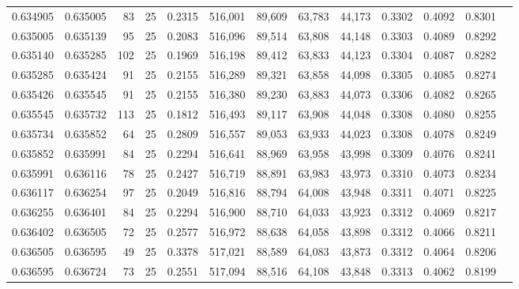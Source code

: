 \begin{tabular}{rrrrrrrrrrrrr}
0.634905 & 0.635005 &    83 &  25 &                                     0.2315 & 516,001 &  89,609 &  63,783 &  44,173 & 0.3302 & 0.4092 & 0.8301 \\
0.635005 & 0.635139 &    95 &  25 &                                     0.2083 & 516,096 &  89,514 &  63,808 &  44,148 & 0.3303 & 0.4089 & 0.8292 \\
0.635140 & 0.635285 &   102 &  25 &                                     0.1969 & 516,198 &  89,412 &  63,833 &  44,123 & 0.3304 & 0.4087 & 0.8282 \\
0.635285 & 0.635424 &    91 &  25 &                                     0.2155 & 516,289 &  89,321 &  63,858 &  44,098 & 0.3305 & 0.4085 & 0.8274 \\
0.635426 & 0.635545 &    91 &  25 &                                     0.2155 & 516,380 &  89,230 &  63,883 &  44,073 & 0.3306 & 0.4082 & 0.8265 \\
0.635545 & 0.635732 &   113 &  25 &                                     0.1812 & 516,493 &  89,117 &  63,908 &  44,048 & 0.3308 & 0.4080 & 0.8255 \\
0.635734 & 0.635852 &    64 &  25 &                                     0.2809 & 516,557 &  89,053 &  63,933 &  44,023 & 0.3308 & 0.4078 & 0.8249 \\
0.635852 & 0.635991 &    84 &  25 &                                     0.2294 & 516,641 &  88,969 &  63,958 &  43,998 & 0.3309 & 0.4076 & 0.8241 \\
0.635991 & 0.636116 &    78 &  25 &                                     0.2427 & 516,719 &  88,891 &  63,983 &  43,973 & 0.3310 & 0.4073 & 0.8234 \\
0.636117 & 0.636254 &    97 &  25 &                                     0.2049 & 516,816 &  88,794 &  64,008 &  43,948 & 0.3311 & 0.4071 & 0.8225 \\
0.636255 & 0.636401 &    84 &  25 &                                     0.2294 & 516,900 &  88,710 &  64,033 &  43,923 & 0.3312 & 0.4069 & 0.8217 \\
0.636402 & 0.636505 &    72 &  25 &                                     0.2577 & 516,972 &  88,638 &  64,058 &  43,898 & 0.3312 & 0.4066 & 0.8211 \\
0.636505 & 0.636595 &    49 &  25 &                                     0.3378 & 517,021 &  88,589 &  64,083 &  43,873 & 0.3312 & 0.4064 & 0.8206 \\
0.636595 & 0.636724 &    73 &  25 &                                     0.2551 & 517,094 &  88,516 &  64,108 &  43,848 & 0.3313 & 0.4062 & 0.8199 \\

\end{tabular}
